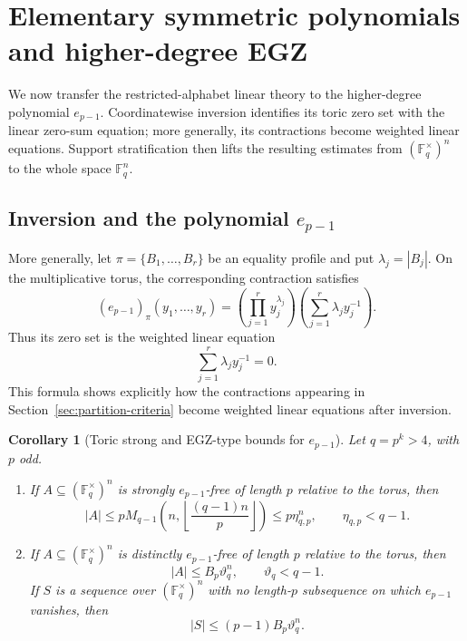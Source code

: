 \documentclass[10pt,a4paper]{amsart}
\newtheorem{corollary}[theorem]{Corollary}
\theoremstyle{definition}
\newcommand{\F}{\mathbb F}
\newcommand{\1}{\mathbf 1}
\begin{document}
\section{Elementary symmetric polynomials and higher-degree EGZ}\label{sec:higher-egz}

{We now transfer the restricted-alphabet linear theory to the higher-degree polynomial $e_{p-1}$.  Coordinatewise inversion identifies its toric zero set with the linear zero-sum equation; more generally, its contractions become weighted linear equations.  Support stratification then lifts the resulting estimates from $(\F_q^\times)^n$ to the whole space $\F_q^n$.}

\subsection{Inversion and the polynomial \texorpdfstring{$e_{p-1}$}{e(p-1)}}
{More generally, let $\pi=\{B_1,\ldots,B_r\}$ be an equality profile and put $\lambda_j=|B_j|$.  On the multiplicative torus, the corresponding contraction satisfies
\[
 (e_{p-1})_\pi(y_1,\ldots,y_r)
 =\left(\prod_{j=1}^r y_j^{\lambda_j}\right)
 \left(\sum_{j=1}^r\lambda_jy_j^{-1}\right).
\]
Thus its zero set is the weighted linear equation
\[
 \sum_{j=1}^r\lambda_jy_j^{-1}=0.
\]
This formula shows explicitly how the contractions appearing in Section~\ref{sec:partition-criteria} become weighted linear equations after inversion.}

\begin{corollary}[Toric strong and EGZ-type bounds for $e_{p-1}$]\label{cor:toric-epminus1}
Let $q=p^k>4$, with $p$ odd.

\begin{enumerate}[label=\textup{(\roman*)}]
\item If $A\subseteq(\F_q^\times)^n$ is strongly $e_{p-1}$-free of length $p$ relative to the torus, then
\[
 |A|\le
 pM_{q-1}\left(n,\left\lfloor\frac{(q-1)n}{p}\right\rfloor\right)
 \le p\eta_{q,p}^n,
 \qquad \eta_{q,p}<q-1.
\]
\item If $A\subseteq(\F_q^\times)^n$ is distinctly $e_{p-1}$-free of length $p$ relative to the torus, then
\[
 |A|\le B_p\vartheta_q^n,
 \qquad \vartheta_q<q-1.
\]
If $S$ is a sequence over $(\F_q^\times)^n$ with no length-$p$ subsequence on which $e_{p-1}$ vanishes, then
\[
 |S|\le(p-1)B_p\vartheta_q^n.
\]
\end{enumerate}
\end{corollary}
\end{document}
